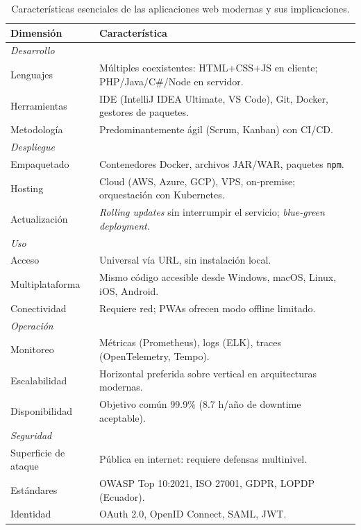 \begin{table}[htbp]
\centering
\caption{Características esenciales de las aplicaciones web modernas y sus implicaciones.}
\label{tab:caracteristicas-web}
\footnotesize
\begin{tabularx}{\textwidth}{lX}
\toprule
\textbf{Dimensión} & \textbf{Característica}\\
\midrule
\multicolumn{2}{l}{\emph{Desarrollo}}\\
Lenguajes & Múltiples coexistentes: HTML+CSS+JS en cliente; PHP/Java/C\#/Node en servidor.\\
Herramientas & IDE (IntelliJ IDEA Ultimate, VS Code), Git, Docker, gestores de paquetes.\\
Metodología & Predominantemente ágil (Scrum, Kanban) con CI/CD.\\
\midrule
\multicolumn{2}{l}{\emph{Despliegue}}\\
Empaquetado & Contenedores Docker, archivos JAR/WAR, paquetes \texttt{npm}.\\
Hosting & Cloud (AWS, Azure, GCP), VPS, on-premise; orquestación con Kubernetes.\\
Actualización & \emph{Rolling updates} sin interrumpir el servicio; \emph{blue-green deployment}.\\
\midrule
\multicolumn{2}{l}{\emph{Uso}}\\
Acceso & Universal vía URL, sin instalación local.\\
Multiplataforma & Mismo código accesible desde Windows, macOS, Linux, iOS, Android.\\
Conectividad & Requiere red; PWAs ofrecen modo offline limitado.\\
\midrule
\multicolumn{2}{l}{\emph{Operación}}\\
Monitoreo & Métricas (Prometheus), logs (ELK), traces (OpenTelemetry, Tempo).\\
Escalabilidad & Horizontal preferida sobre vertical en arquitecturas modernas.\\
Disponibilidad & Objetivo común 99.9\% (8.7 h/año de downtime aceptable).\\
\midrule
\multicolumn{2}{l}{\emph{Seguridad}}\\
Superficie de ataque & Pública en internet: requiere defensas multinivel.\\
Estándares & OWASP Top 10:2021, ISO 27001, GDPR, LOPDP (Ecuador).\\
Identidad & OAuth 2.0, OpenID Connect, SAML, JWT.\\
\bottomrule
\end{tabularx}
\end{table}


